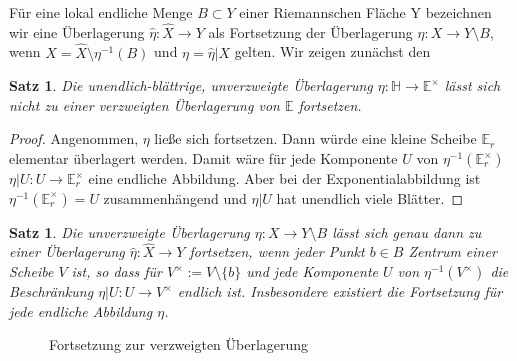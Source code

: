 \documentclass[12pt,a4paper]{article}
\theoremstyle{plain}
\newtheorem{Satz}[Theorem]{Satz}
\numberwithin{equation}{section}
\begin{document}
Für eine lokal endliche Menge $B\subset Y$ einer Riemannschen Fläche Y bezeichnen wir eine Überlagerung $\hat{\eta}:\hat{X} \rightarrow Y$ als Fortsetzung der Überlagerung $\eta: X \rightarrow  Y\setminus B$, wenn $X=\hat{X}\setminus\eta^{-1}(B)$ und $\eta = \hat{\eta}|X$ gelten. Wir zeigen zunächst den
\begin{Satz} Die unendlich-blättrige, unverzweigte Überlagerung $\eta: \mathbb{H}\rightarrow \mathbb{E}^\times$ lässt sich nicht zu einer verzweigten Überlagerung von $\mathbb{E}$ fortsetzen.
\end{Satz}
\begin{proof}
Angenommen, $\eta$ ließe sich fortsetzen. Dann würde eine kleine Scheibe $\mathbb{E}_r$ elementar überlagert werden. Damit wäre für jede Komponente $U$ von $\eta^{-1}(\mathbb{E}_r^\times)$ $\eta|U : U\rightarrow \mathbb{E}_r^\times$ eine endliche Abbildung. Aber bei der Exponentialabbildung ist $\eta^{-1}(\mathbb{E}^\times_r) = U$ zusammenhängend und $\eta|U$ hat unendlich viele Blätter.
\end{proof}
\begin{Satz} Die unverzweigte Überlagerung $\eta: X\rightarrow Y\setminus B$ lässt sich genau dann zu einer Überlagerung $\hat{\eta}: \hat{X} \rightarrow Y$ fortsetzen, wenn jeder Punkt $b\in B$ Zentrum einer Scheibe $V$ ist, so dass für $V^\times:=V\setminus\{b\}$ und jede Komponente $U$ von $\eta^{-1}(V^\times)$ die Beschränkung $\eta|U: U\rightarrow V^\times$ endlich ist. Insbesondere existiert die Fortsetzung für jede endliche Abbildung $\eta$.
\end{Satz}
\begin{figure} \def\svgwidth{\textwidth}  \caption{Fortsetzung zur  verzweigten Überlagerung}\label{KVUe}
\end{figure}
\end{document}
